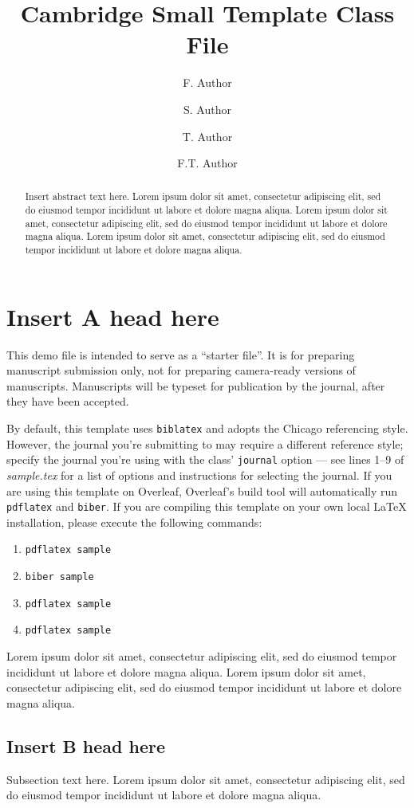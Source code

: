 \documentclass[
  journal=small,
  manuscript=article-type,  %
  year=2020,
  volume=37,
]{cup-journal}
\title{Cambridge Small Template Class File}
\author{F. Author}
\affiliation{First Division, Organization, City, Pincode, State, Country}
\author{S. Author}
\affiliation{Second Division, Organization, City, Pincode, State, Country}
\author{T. Author}
\affiliation{Second Division, Organization, City, Pincode, State, Country}
\author{F.T. Author}
\affiliation{Fourth Division, Organization, City, Pincode, State, Country}
\begin{document}
\begin{abstract}
Insert abstract text here. Lorem ipsum dolor sit amet, consectetur adipiscing elit, sed do eiusmod tempor incididunt ut labore et dolore magna aliqua. Lorem ipsum dolor sit amet, consectetur adipiscing elit, sed do eiusmod tempor incididunt ut labore et dolore magna aliqua. Lorem ipsum dolor sit amet, consectetur adipiscing elit, sed do eiusmod tempor incididunt ut labore et dolore magna aliqua. 
\end{abstract}

\section{Insert A head here}
This demo file is intended to serve as a ``starter file''. It is for preparing manuscript submission only, not for preparing camera-ready versions of manuscripts. Manuscripts will be typeset for publication by the journal, after they have been accepted.

By default, this template uses \texttt{biblatex} and adopts the Chicago referencing style. However, the journal you’re submitting to may require a different reference style; specify the journal you're using with the class' \texttt{journal} option --- see lines 1--9 of \emph{sample.tex} for a list of options and instructions for selecting the journal. 
If you are using this template on Overleaf, Overleaf's build tool will automatically run \texttt{pdflatex} and \texttt{biber}. If you are compiling this template on your own local \LaTeX{} installation, please execute the following commands:
\begin{enumerate}
    \item \verb|pdflatex sample|
    \item \verb|biber sample|
    \item \verb|pdflatex sample|
    \item \verb|pdflatex sample|
\end{enumerate}

Lorem ipsum dolor sit amet, consectetur adipiscing elit, sed do eiusmod tempor incididunt ut labore et dolore magna aliqua. Lorem ipsum dolor sit amet, consectetur adipiscing elit, sed do eiusmod tempor incididunt ut labore et dolore magna aliqua. 


\subsection{Insert B head here}
Subsection text here. Lorem ipsum\autocite{Bayer_etal_2013} dolor sit amet, consectetur adipiscing elit, sed do eiusmod tempor incididunt ut labore\autocite{Adade_etal_2007} et dolore magna aliqua. 
\end{document}
